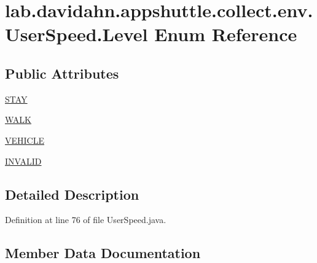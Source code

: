 \hypertarget{enumlab_1_1davidahn_1_1appshuttle_1_1collect_1_1env_1_1_user_speed_1_1_level}{\section{lab.\-davidahn.\-appshuttle.\-collect.\-env.\-User\-Speed.\-Level \-Enum \-Reference}
\label{enumlab_1_1davidahn_1_1appshuttle_1_1collect_1_1env_1_1_user_speed_1_1_level}
}
\subsection*{\-Public \-Attributes}
\begin{DoxyCompactItemize}
\item 
\hyperlink{enumlab_1_1davidahn_1_1appshuttle_1_1collect_1_1env_1_1_user_speed_1_1_level_a05976b2f0f439754f7009e469f076160}{\-S\-T\-A\-Y}
\item 
\hyperlink{enumlab_1_1davidahn_1_1appshuttle_1_1collect_1_1env_1_1_user_speed_1_1_level_a5f7bb7d809c6a05f7bbfdb34cff20eae}{\-W\-A\-L\-K}
\item 
\hyperlink{enumlab_1_1davidahn_1_1appshuttle_1_1collect_1_1env_1_1_user_speed_1_1_level_a7972ea82769abe95e8f0e629e700bdad}{\-V\-E\-H\-I\-C\-L\-E}
\item 
\hyperlink{enumlab_1_1davidahn_1_1appshuttle_1_1collect_1_1env_1_1_user_speed_1_1_level_add8063b2ee4467a3e7416a21df3532c7}{\-I\-N\-V\-A\-L\-I\-D}
\end{DoxyCompactItemize}


\subsection{\-Detailed \-Description}


\-Definition at line 76 of file \-User\-Speed.\-java.



\subsection{\-Member \-Data \-Documentation}
\hypertarget{enumlab_1_1davidahn_1_1appshuttle_1_1collect_1_1env_1_1_user_speed_1_1_level_add8063b2ee4467a3e7416a21df3532c7}{
\subsubsection[{\-I\-N\-V\-A\-L\-I\-D}]{}}\label{enumlab_1_1davidahn_1_1appshuttle_1_1collect_1_1env_1_1_user_speed_1_1_level_add8063b2ee4467a3e7416a21df3532c7}


